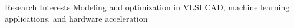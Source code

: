 
\begin{rSection}{Research Interests}
    Modeling and optimization in VLSI CAD, machine learning applications, and hardware acceleration 
\end{rSection}

